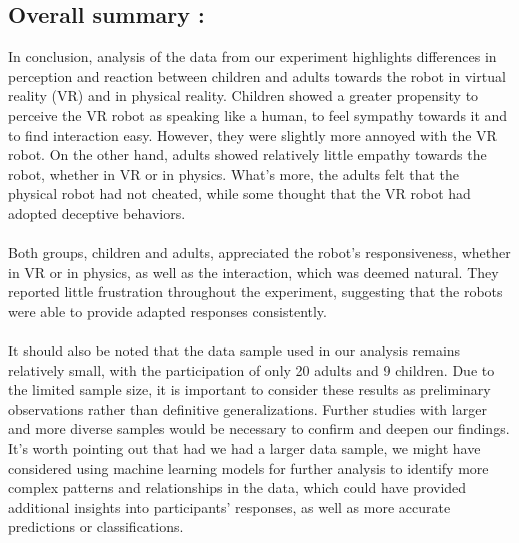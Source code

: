 \subsection{Overall summary :}
In conclusion, analysis of the data from our experiment highlights differences in perception and reaction between children and adults towards the robot in virtual reality (VR) and in physical reality. Children showed a greater propensity to perceive the VR robot as speaking like a human, to feel sympathy towards it and to find interaction easy. However, they were slightly more annoyed with the VR robot. On the other hand, adults showed relatively little empathy towards the robot, whether in VR or in physics. What's more, the adults felt that the physical robot had not cheated, while some thought that the VR robot had adopted deceptive behaviors.\\
\\
Both groups, children and adults, appreciated the robot's responsiveness, whether in VR or in physics, as well as the interaction, which was deemed natural. They reported little frustration throughout the experiment, suggesting that the robots were able to provide adapted responses consistently.\\
\\
It should also be noted that the data sample used in our analysis remains relatively small, with the participation of only 20 adults and 9 children. Due to the limited sample size, it is important to consider these results as preliminary observations rather than definitive generalizations. Further studies with larger and more diverse samples would be necessary to confirm and deepen our findings.\\
It's worth pointing out that had we had a larger data sample, we might have considered using machine learning models for further analysis to identify more complex patterns and relationships in the data, which could have provided additional insights into participants' responses, as well as more accurate predictions or classifications.\\
